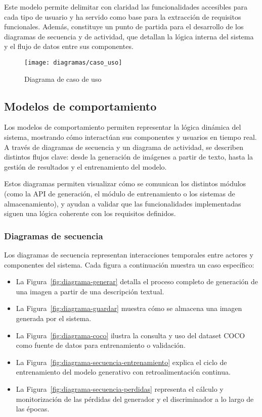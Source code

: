 Este modelo permite delimitar con claridad las funcionalidades accesibles para cada tipo de usuario y ha servido como base para la extracción de requisitos funcionales. Además, constituye un punto de partida para el desarrollo de los diagramas de secuencia y de actividad, que detallan la lógica interna del sistema y el flujo de datos entre sus componentes.

\begin{figure}[H]
    \centering
    \texttt{[image: diagramas/caso\_uso]}
    \caption{Diagrama de caso de uso}
    \label{fig:caso-uso}
\end{figure}


\subsection{Modelos de comportamiento}
Los modelos de comportamiento permiten representar la lógica dinámica del sistema, mostrando cómo interactúan sus componentes y usuarios en tiempo real. A través de diagramas de secuencia y un diagrama de actividad, se describen distintos flujos clave: desde la generación de imágenes a partir de texto, hasta la gestión de resultados y el entrenamiento del modelo.

Estos diagramas permiten visualizar cómo se comunican los distintos módulos (como la API de generación, el módulo de entrenamiento o los sistemas de almacenamiento), y ayudan a validar que las funcionalidades implementadas siguen una lógica coherente con los requisitos definidos.

\subsubsection{Diagramas de secuencia}
Los diagramas de secuencia representan interacciones temporales entre actores y componentes del sistema. Cada figura a continuación muestra un caso específico:

\begin{itemize}
    \item La Figura~\ref{fig:diagrama-generar} detalla el proceso completo de generación de una imagen a partir de una descripción textual.
    \item La Figura~\ref{fig:diagrama-guardar} muestra cómo se almacena una imagen generada por el sistema.
    \item La Figura~\ref{fig:diagrama-coco} ilustra la consulta y uso del dataset COCO como fuente de datos para entrenamiento o validación.
    \item La Figura~\ref{fig:diagrama-secuencia-entrenamiento} explica el ciclo de entrenamiento del modelo generativo con retroalimentación continua.
    \item La Figura~\ref{fig:diagrama-secuencia-perdidas} representa el cálculo y monitorización de las pérdidas del generador y el discriminador a lo largo de las épocas.
\end{itemize}

